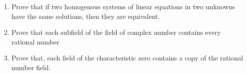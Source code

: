 \begin{enumerate}[label=\thesubsection.\arabic*.,ref=\thesubsection.\theenumi]
%
\\
\solution

\item Prove that if two homogenous systems of linear equations in two unknowns have the same solutions, then they are equivalent.
\\
\solution

\item Prove that each subfield of the field of complex number contains every rational number
\\
\solution

%
\item Prove that, each field of the characteristic zero contains a copy of the rational number field.
\\
\solution

\end{enumerate}


